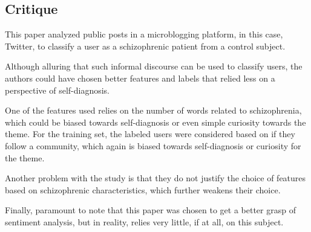 \documentclass{Paper_Summary}
\begin{document}
\makepapertitle

\breakline

\begin{center}
    \section*{Critique}
\end{center}

    This paper analyzed public posts in a microblogging platform, in this case, Twitter, to classify a user as a schizophrenic patient from a control subject.

    Although alluring that such informal discourse can be used to classify users, the authors could have chosen better features and labels that relied less on a perspective of self-diagnosis.

    One of the features used relies on the number of words related to schizophrenia, which could be biased towards self-diagnosis or even simple curiosity towards the theme.
    For the training set, the labeled users were considered based on if they follow a community, which again is biased towards self-diagnosis or curiosity for the theme.

    Another problem with the study is that they do not justify the choice of features based on schizophrenic characteristics, which further weakens their choice.

    Finally, paramount to note that this paper was chosen to get a better grasp of sentiment analysis, but in reality, relies very little, if at all, on this subject.

\breakline
\end{document}
